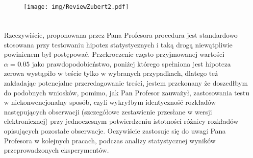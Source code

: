 \section*{}
\begin{frame}
\frametitle{\secname}
\begin{figure}[!ht]
	\centering
	\texttt{[image: img/ReviewZubert2.pdf]}	
\end{figure}
\end{frame}

\section*{}
\begin{frame}
\frametitle{\secname}

\small
Rzeczywiście, proponowana przez Pana Profesora procedura jest standardowo stosowana przy testowaniu hipotez statystycznych i taką drogą niewątpliwie powinienem był postępować. Przekroczenie często przyjmowanej  wartości $\alpha=0.05$ jako prawdopodobieństwo, poniżej którego spełniona jest hipoteza zerowa wystąpiło w teście tylko w wybranych przypadkach, dlatego też zakładając potencjalne przeredagowanie treści, jestem przekonany że doszedłbym do podobnych wniosków, pomimo, jak Pan Profesor zauważył, zastosowania testu w niekonwencjonalny sposób, czyli wykryłbym identyczność rozkładów  następujących obserwacji (szczegółowe zestawienie przesłane w wersji elektronicznej) przy jednoczesnym potwierdzeniu istotności różnicy rozkładów opisujących pozostałe obserwacje. Oczywiście zastosuje się do uwagi Pana Profesora w kolejnych pracach, podczas analizy statystycznej wyników przeprowadzonych eksperymentów.

\end{frame}
